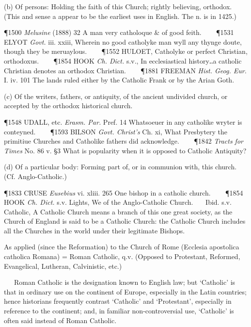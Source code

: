 \begin{description}[wide, labelwidth=!, labelindent=0pt]
\begin{myenumerate}
\noindent
(b) Of persons: Holding the faith of this Church; rightly believing, orthodox. (This and sense a appear to be the earliest uses in English. The n. is in 1425.)

\P 1500 \textit{Melusine}  (1888) 32 A man very catholoque \& of good feith.    
\P 1531 ELYOT  \textit{Govt.} iii. xxiii, Wherein no good catholyke man wyll any thynge doute, though they be meruaylous.    
\P 1552 HULOET,  Catholyke or perfect Christian, orthodoxus.    
\P 1854 HOOK  \textit{Ch. Dict.} s.v., In ecclesiastical history‥a catholic Christian denotes an orthodox Christian.    
\P 1881 FREEMAN  \textit{Hist. Geog. Eur.} I. iv. 101 The lands ruled either by the Catholic Frank or by the Arian Goth.

\noindent
(c) Of the writers, fathers, or antiquity, of the ancient undivided church, or accepted by the orthodox historical church.

\P 1548 UDALL, etc. \textit{Erasm. Par.} Pref. 14 Whatsoeuer in any catholike wryter is conteyned.    
\P 1593 BILSON  \textit{Govt. Christ's} Ch. xi, What Presbytery the primitiue Churches and Catholike fathers did acknowledge.    
\P 1842 \textit{Tracts  for Times} No. 86 v. §3 What is popularity when it is opposed to Catholic Antiquity?

\noindent
(d) Of a particular body: Forming part of, or in communion with, this church. (Cf. Anglo-Catholic.)

\P 1833 CRUSE  \textit{Eusebius} vi. xliii. 265 One bishop in a catholic church.    
\P 1854 HOOK  \textit{Ch. Dict.} s.v. Lights, We of the Anglo-Catholic Church.    Ibid. s.v. Catholic, A Catholic Church means a branch of this one great society, as the Church of England is said to be a Catholic Church: the Catholic Church includes all the Churches in the world under their legitimate Bishops.

 As applied (since the Reformation) to the Church of Rome (Ecclesia apostolica catholica Romana) = Roman Catholic, q.v. (Opposed to Protestant, Reformed, Evangelical, Lutheran, Calvinistic, etc.)

   Roman Catholic is the designation known to English law; but ‘Catholic’ is that in ordinary use on the continent of Europe, especially in the Latin countries; hence historians frequently contrast ‘Catholic’ and ‘Protestant’, especially in reference to the continent; and, in familiar non-controversial use, ‘Catholic’ is often said instead of Roman Catholic.


\end{myenumerate}
\end{description}
